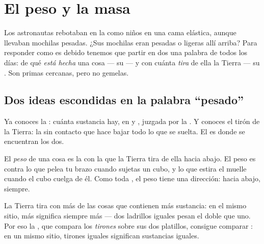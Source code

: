 \chapter{El peso y la masa}\label{ch:g4:weight-and-mass}

Los astronautas rebotaban en la  como niños en una cama elástica,
aunque llevaban mochilas pesadas. ¿Sus mochilas eran pesadas o
ligeras allí arriba? Para responder como es debido tenemos que
partir en dos una palabra de todos los días: de qué \emph{está hecha}
una cosa --- su  --- y con cuánta  \emph{tira} de ella la
Tierra --- su . Son primas cercanas, pero no gemelas.

\section{Dos ideas escondidas en la palabra ``pesado''}

Ya conoces la : cuánta sustancia hay, en  y
, juzgada por la . Y conoces el tirón de la
Tierra: la  sin contacto que hace bajar todo lo que se suelta.
El  es donde se encuentran los dos.

\begin{definition}[El peso]\label{def:g4:weight-and-mass:weight}
El \emph{peso} de una cosa es la  con la que la
Tierra tira de ella hacia abajo. El peso es contra lo que pelea tu
brazo cuando sujetas un cubo, y lo que estira el muelle cuando el cubo
cuelga de él. Como toda , el peso tiene una dirección: hacia
abajo, siempre.
\end{definition}

\begin{proposition}\label{prop:g4:weight-and-mass:morestuff}
La Tierra tira con más  de las cosas que contienen más
sustancia: en el mismo sitio, más  significa siempre más
 --- dos ladrillos iguales pesan el doble que uno. Por eso la
, que compara los \emph{tirones} sobre sus dos platillos,
consigue comparar \emph{}: en un mismo sitio, tirones iguales
significan sustancias iguales.
\end{proposition}

